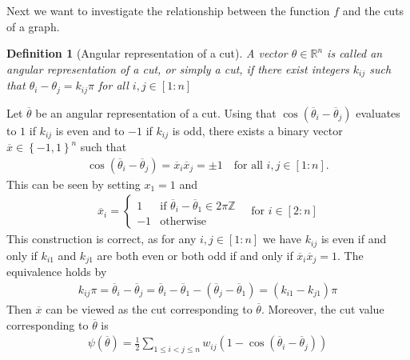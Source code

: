 \documentclass[12pt,a4paper]{article}
\theoremstyle{mythm}
\newtheorem{Def}[thm]{Definition}
\begin{document}
Next we want to investigate the relationship between the function $ f $ and the cuts of a graph.
\begin{Def}[Angular representation of a cut]
  A vector $ \theta \in \mathbb{R} ^{ n }  $ is called an angular representation of a cut, or simply a cut, if there exist integers $ k _{ ij }  $ such that $ \theta_i - \theta_j = k _{ ij }
\pi$ for all $ i,j \in \left[ 1:n \right]  $ 
\end{Def} 
Let $ \overline{ \theta }  $ be an angular representation of a cut.
Using that $ \cos( \overline{ \theta }  _{ i } - \overline{ \theta} _{ j }  )  $ evaluates to $ 1 $ if $ k _{ ij }  $ is even and to $ -1 $ if $ k _{ij} $ is odd,
there exists a binary vector $ \overline{ x } \in \left\{ -1,1 \right\} ^{ n }  $  such that
\begin{align}
\label{eq:cutrel} 
\cos( \overline{ \theta } _{ i } - \overline{ \theta }  _{ j } ) = \overline{ x } _{ i } \overline{ x } _{ j } = \pm 1 \quad \text{for all } i,j \in \left[ 1:n \right].
\end{align} 
This can be seen by setting $ x_1 = 1 $ and 
\begin{align*}
\overline{ x }  _{ i } = \begin{cases}
1 & \text{if } \overline{ \theta}_i - \overline{ \theta}_1 \in 2 \pi \mathbb{Z} \\
-1 & \text{otherwise} 
\end{cases}
\quad \text{for } i \in \left[ 2:n \right] 
\end{align*} 
This construction is correct, as for any $ i,j \in \left[ 1:n \right]  $ we have  $ k _{
ij }  $ is even if and only if $ k _{ i1 }  $ and $ k _{ j1 } $ are both even or both odd if and only if $ \overline{ x } _i \overline{ x } _j = 1 $.
The equivalence holds by
\begin{align*}
 k _{ ij } \pi = \overline{ \theta} _{ i } - \overline{ \theta} _{ j } = \overline{ \theta} _{ i } - \overline{ \theta} _{ 1 } - ( \overline{ \theta} _{ j
} - \overline{ \theta} _{ 1 } ) = ( k _{ i1 } - k _{ j1 } ) \pi 
\end{align*} 
Then $ \overline{ x }  $ can be viewed as the cut corresponding to $ \overline{ \theta }  $.
Moreover, the cut value corresponding to $ \overline{ \theta }  $ is
\begin{align}
\label{eq:psiRelaxedCut} 
\psi ( \overline{ \theta } ) = \frac{ 1 }{ 2 } \sum_{ 1 \leq i < j \leq n  }^{  } w _{ ij } \left( 1 - \cos( \overline{ \theta } _{ i } - \overline{ \theta } _{ j }  )  \right) 
\end{align} 
\end{document}
